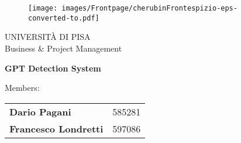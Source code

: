 \begin{titlepage}
    \begin{figure}[!htb]
        \centering
        \texttt{[image: images/Frontpage/cherubinFrontespizio-eps-converted-to.pdf]}
    \end{figure}
    
    \begin{center}
        \LARGE{UNIVERSITÀ DI PISA}
        \vspace{5mm}
        \\ \LARGE{Business \& Project Management}
    \end{center}
    
    \vspace{15mm}
    \begin{center}
        {\LARGE{\bf GPT Detection System }}
        
        
    \end{center}
    \vspace{30mm}
    
    \begin{minipage}[t]{0.47\textwidth}
        {\large{Members: \vspace{5mm}}{

        	\begin{tabular}{lr}
        		\vspace{3mm} \bf Dario Pagani & 585281 \\
        		\bf Francesco Londretti & 597086
        	\end{tabular}
            }}
    \end{minipage}
    \hfill
    
    \vspace{30mm}
    \hrulefill
    
    \end{titlepage}